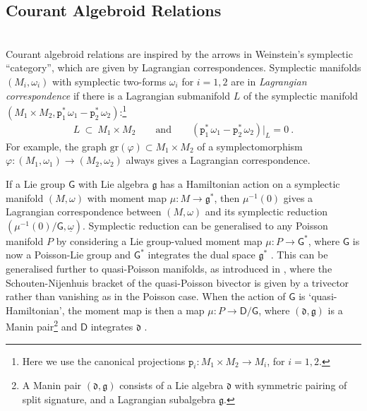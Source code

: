 \documentclass[a4paper, reqno, 11pt]{amsart}
\numberwithin{equation}{section}
\theoremstyle{definition}
\newcommand{\red}[1]{\underline{#1}}
\newcommand{\rmp}{\mathtt{p}}
\newcommand{\frg}{\mathfrak{g}}
\newcommand{\frd}{\mathfrak{d}}
\newcommand{\sfD}{{\mathsf{D}}}
\newcommand{\sfG}{{\mathsf{G}}}
\newcommand{\gr}{\text{gr}}
\theoremstyle{remark}
\begin{document}
\medskip

\subsection{Courant Algebroid Relations}~\\[5pt]
Courant algebroid relations are inspired by the arrows in Weinstein's symplectic ``category'', which are given by Lagrangian correspondences. Symplectic manifolds $(M_i, \omega_i)$ with symplectic two-forms $\omega_i$ for $i=1,2$ are in \emph{Lagrangian correspondence} if there is a Lagrangian submanifold $L$ of the symplectic manifold $(M_1 \times M_2, \rmp_1^*\, \omega_1 - \rmp_2^*\,\omega_2)$:\footnote{Here we use the canonical projections $\rmp_i \colon M_1 \times M_2 \to M_i$, for $i=1,2$.}
\begin{align}\label{eqn:Lagcorresp}
    L \ \subset \ M_1 \times M_2  \qquad \text{and} \qquad (\rmp_1^* \, \omega_1 - \rmp_2^*\,\omega_2)\big|_L = 0\ .
\end{align}
For example, the graph $\gr(\varphi) \subset M_1 \times M_2$ of a symplectomorphism $\varphi \colon (M_1, \omega_1) \to (M_2, \omega_2)$ always gives a Lagrangian correspondence. 

If a Lie group $\sfG$ with Lie algebra $\frg$ has a Hamiltonian action on a symplectic manifold $(M,\omega)$ with moment map $\mu \colon M \to \frg^*$, then $\mu^{-1}(0)$ gives a Lagrangian correspondence between $(M,\omega)$ and its symplectic reduction $(\mu^{-1}(0)/\sfG, \red \omega)$. Symplectic reduction can be generalised to any Poisson manifold $P$ by considering a Lie group-valued moment map $\mu \colon P \to \sfG^*$, where $\sfG$ is now a Poisson-Lie group and $\sfG^*$ integrates the dual space $\frg^*$ \cite{lu1991momentum}. 
This can be generalised further to quasi-Poisson manifolds, as introduced in \cite{alekseev1998lie}, where the Schouten-Nijenhuis bracket of the quasi-Poisson bivector is given by a trivector rather than vanishing as in the Poisson case. When the action of $\sfG$ is `quasi-Hamiltonian', the moment map is then a map $\mu \colon P \to \sfD/\sfG$, where $(\frd, \frg)$ is a Manin pair\footnote{A Manin pair $(\frd, \frg)$ consists of a Lie algebra $\frd$ with symmetric pairing of split signature, and a Lagrangian subalgebra $\frg$.} and $\sfD$ integrates $\frd$ \cite{alekseev2000manin,bursztyn2007dirac}. 
\end{document}

